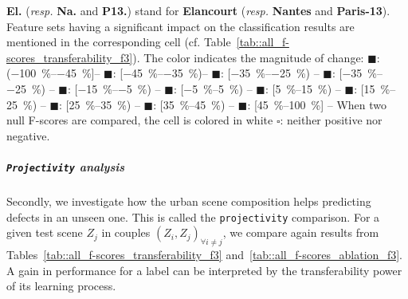 \begin{table}[htbp]
{                \textbf{El.} (\textit{resp.} \textbf{Na.} and \textbf{P13.}) stand for \textbf{Elancourt} (\textit{resp.} \textbf{Nantes} and \textbf{Paris-13}).
                Feature sets having a significant impact on the classification results are mentioned in the corresponding cell (cf. Table~\ref{tab::all_f-scores_transferability_f3}).
                The color indicates the magnitude of change: 
                \textcolor{LOSS45}{\(\blacksquare\)}: (\SIrange[range-phrase={,  }]{-100}{-45}{\percent}]--
                \textcolor{LOSS3545}{\(\blacksquare\)}: [\SIrange[range-phrase={,  }]{-45}{-35}{\percent})--
                \textcolor{LOSS2535}{\(\blacksquare\)}: [\SIrange[range-phrase={, }]{-35}{-25}{\percent}) --
                \textcolor{LOSS1525}{\(\blacksquare\)}: [\SIrange[range-phrase={, }]{-35}{-25}{\percent}) --
                \textcolor{LOSS0515}{\(\blacksquare\)}: [\SIrange[range-phrase={, }]{-15}{-5}{\percent}) --
                \textcolor{STBL}{\(\blacksquare\)}: [\SIrange[range-phrase={, }]{-5}{5}{\percent}) --
                \textcolor{GAIN0515}{\(\blacksquare\)}: [\SIrange[range-phrase={, }]{5}{15}{\percent}) --
                \textcolor{GAIN1525}{\(\blacksquare\)}: [\SIrange[range-phrase={, }]{15}{25}{\percent}) --
                \textcolor{GAIN2535}{\(\blacksquare\)}: [\SIrange[range-phrase={, }]{25}{35}{\percent}) --
                \textcolor{GAIN3545}{\(\blacksquare\)}: [\SIrange[range-phrase={, }]{35}{45}{\percent}) --
                \textcolor{GAIN45}{\(\blacksquare\)}: [\SIrange[range-phrase={, }]{45}{100}{\percent}] --
                When two null F-scores are compared, the cell is colored in white \(\square\): neither positive nor negative.
            }
        \end{table}

        \subparagraph{\texttt{Projectivity} analysis}
            Secondly, we investigate how the urban scene composition helps predicting defects in an unseen one.
            This is called the \texttt{projectivity} comparison.
            For a given test scene $Z_j$ in couples $(Z_i, Z_j)_{\forall i \neq j}$, we compare again results from Tables~\ref{tab::all_f-scores_transferability_f3} and~\ref{tab::all_f-scores_ablation_f3}.
            A gain in performance for a label can be interpreted by the transferability power of its learning process.\\

